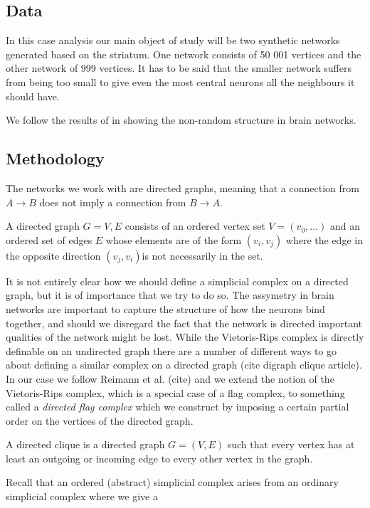 \subsection{Data}
In this case analysis our main object of study will be two synthetic networks generated based on the striatum.
One network consists of 50 001 vertices and the other network of 999 vertices. It has to be said that the smaller network suffers from being too small to give even the most central neurons all the neighbours it should have.

We follow the results of \cite{reimann} in showing the non-random structure in brain networks.

\subsection{Methodology}
The networks we work with are directed graphs, meaning that a connection from $A \to B$ does not imply a connection from $B \to A$.
\begin{definition}
A directed graph $G={V,E}$ consists of an ordered vertex set $V=(v_{0},\dots)$ and an ordered set of edges $E$ whose elements are of the form $(v_{i},v_{j})$ where the edge in the opposite direction $(v_{j},v_{i})$is not necessarily in the set.
\end{definition}
It is not entirely clear how we should define a simplicial complex on a directed graph, but it is of importance that we try to do so. The assymetry in brain networks are important to capture the structure of how the neurons bind together, and should we disregard the fact that the network is directed important qualities of the network might be lost. While the Vietoris-Rips complex is directly definable on an undirected graph there are a number of different ways to go about defining a similar complex on a directed graph (cite digraph clique article). In our case we follow Reimann et al. (cite) and we extend the notion of the Vietoris-Rips complex, which is a special case of a flag complex, to something called a \textit{directed flag complex} which we construct by imposing a certain partial order on the vertices of the directed graph.

\begin{definition}
  A directed clique is a directed graph $G=(V,E)$ such that every vertex has at least an outgoing or incoming edge to every other vertex in the graph. \end{definition}

Recall that an ordered (abstract) simplicial complex arises from an ordinary simplicial complex where we give a

